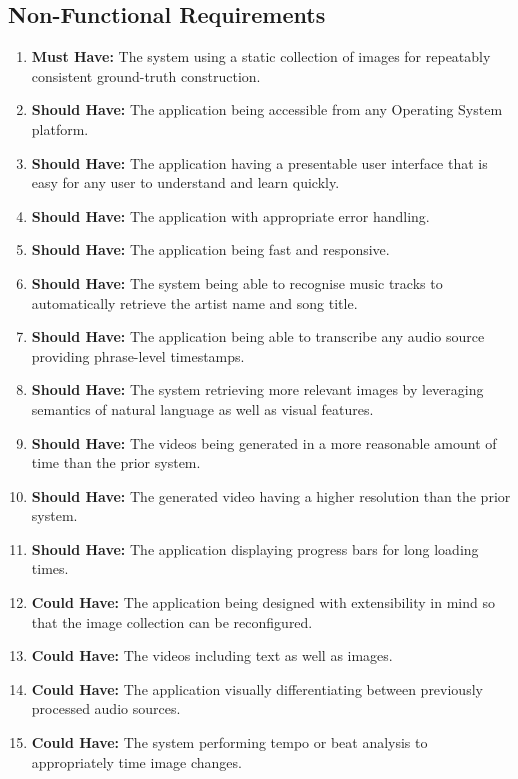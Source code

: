 \documentclass{l4proj}
\begin{document}
\subsection{Non-Functional Requirements}
\begin{enumerate}[resume]
    \item \label{req:18} \textbf{Must Have:} The system using a static collection of images for repeatably consistent ground-truth construction.
    \item \label{req:19} \textbf{Should Have:} The application being accessible from any Operating System platform.
    \item \label{req:20} \textbf{Should Have:} The application having a presentable user interface that is easy for any user to understand and learn quickly.
    \item \label{req:21} \textbf{Should Have:} The application with appropriate error handling.
    \item \label{req:22} \textbf{Should Have:} The application being fast and responsive.
    \item \label{req:23} \textbf{Should Have:} The system being able to recognise music tracks to automatically retrieve the artist name and song title.
    \item \label{req:24} \textbf{Should Have:} The application being able to transcribe any audio source providing phrase-level timestamps.
    \item \label{req:25} \textbf{Should Have:} The system retrieving more relevant images by leveraging semantics of natural language as well as visual features.
    \item \label{req:26} \textbf{Should Have:} The videos being generated in a more reasonable amount of time than the prior system.
    \item \label{req:27} \textbf{Should Have:} The generated video having a higher resolution than the prior system.
    \item \label{req:28} \textbf{Should Have:} The application displaying progress bars for long loading times.
    \item \label{req:29} \textbf{Could Have:} The application being designed with extensibility in mind so that the image collection can be reconfigured.
    \item \label{req:30} \textbf{Could Have:} The videos including text as well as images.
    \item \label{req:31} \textbf{Could Have:} The application visually differentiating between previously processed audio sources.
    \item \label{req:32} \textbf{Could Have:} The system performing tempo or beat analysis to appropriately time image changes.
\end{enumerate}
\end{document}
